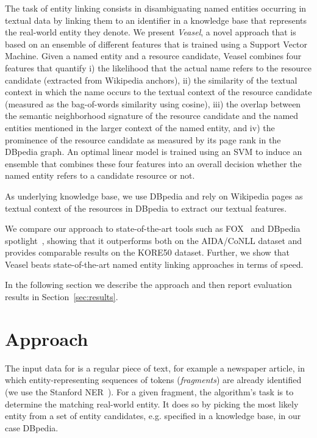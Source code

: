 \documentclass[runningheads,a4paper]{llncs}
\begin{document}
The task of entity linking consists in disambiguating named entities occurring in textual data by linking them to an identifier in a knowledge base that represents the real-world entity they denote. We present \emph{Veasel}, a novel approach that is based on an ensemble of different features that is trained using a Support Vector Machine.  Given a named entity and a resource candidate, Veasel combines four features that quantify i) the likelihood that the actual name refers to the resource candidate (extracted from Wikipedia anchors), ii) the similarity of the textual context in which the name occurs to the textual context of the resource candidate (measured as the bag-of-words similarity using cosine), iii) the overlap between the semantic neighborhood signature of the resource candidate and the named entities mentioned in the larger context of the named entity, and iv) the prominence of the resource candidate as measured by its page rank in the DBpedia graph. An optimal linear model is trained using an SVM to induce an ensemble that combines these four features into an overall decision whether the named entity refers to a candidate resource or not.  

As underlying knowledge base, we use DBpedia and rely on Wikipedia pages as textual context of the resources in DBpedia to extract our textual features.

We compare our approach to state-of-the-art tools such as FOX~\cite{foxdemo} and DBpedia spotlight~\cite{spotlight}, showing that it outperforms both on the AIDA/CoNLL dataset and provides comparable results on the KORE50 dataset. Further, we show that Veasel beats state-of-the-art named entity linking approaches in terms of speed.

In the following section we describe the approach and then report evaluation results in Section~\ref{sec:results}.


\section{Approach}\label{sec:approach}

The input data for {\acronym} is a regular piece of text, for example a newspaper article, in which entity-representing sequences of tokens (\emph{fragments}) are already identified (we use the Stanford NER~\cite{ner}). For a given fragment, the algorithm's task is to determine the matching real-world entity. It does so by picking the most likely entity from a set of entity candidates, e.g. specified in a knowledge base, in our case DBpedia. 
\end{document}
